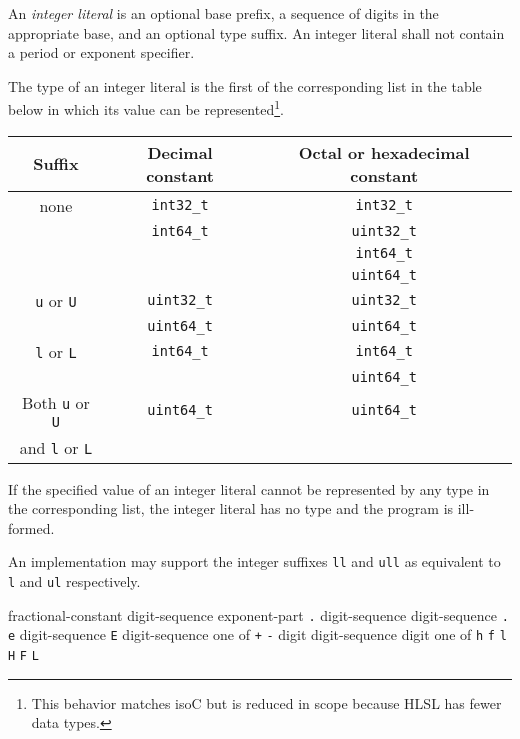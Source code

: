 \p An \textit{integer literal} is an optional base prefix, a sequence of digits
in the appropriate base, and an optional type suffix. An integer literal shall
not contain a period or exponent specifier.

\p The type of an integer literal is the first of the corresponding list in the
table below in which its value can be represented\footnote{This behavior matches
\gls{isoC} but is reduced in scope because HLSL has fewer data types.}.

\begin{center}
  \begin{tabular}{|| c | c | c ||}
    \hline
    Suffix & Decimal constant & Octal or hexadecimal constant \\
    \hline
    \hline
    none & \texttt{int32\_t} & \texttt{int32\_t} \\
         & \texttt{int64\_t} & \texttt{uint32\_t} \\
         &         & \texttt{int64\_t} \\
         &         & \texttt{uint64\_t} \\
    \hline
    \texttt{u} or \texttt{U} & \texttt{uint32\_t} & \texttt{uint32\_t} \\
                             & \texttt{uint64\_t} & \texttt{uint64\_t} \\
    \hline
    \texttt{l} or \texttt{L} & \texttt{int64\_t} & \texttt{int64\_t} \\
                             &  & \texttt{uint64\_t} \\
    \hline
    Both \texttt{u} or \texttt{U} & \texttt{uint64\_t} & \texttt{uint64\_t} \\
    and \texttt{l} or \texttt{L}  &  &  \\
    \hline
  \end{tabular}
\end{center}

\p If the specified value of an integer literal cannot be represented by any
type in the corresponding list, the integer literal has no type and the program
is ill-formed.

\p An implementation may support the integer suffixes \texttt{ll} and
\texttt{ull} as equivalent to \texttt{l} and \texttt{ul} respectively.



\begin{grammar}
  \br
  fractional-constant  \br
  digit-sequence exponent-part \br
  \br
   \texttt{.} digit-sequence\br
  digit-sequence \texttt{.}\br
  \br
  \texttt{e}  digit-sequence\br
  \texttt{E}  digit-sequence\br
   \textnormal{one of}\br
  \texttt{+} \texttt{-}
  \br
  digit\br
  digit-sequence digit
   \textnormal{one of}
  \texttt{h} \texttt{f} \texttt{l} \texttt{H} \texttt{F} \texttt{L}
\end{grammar}


